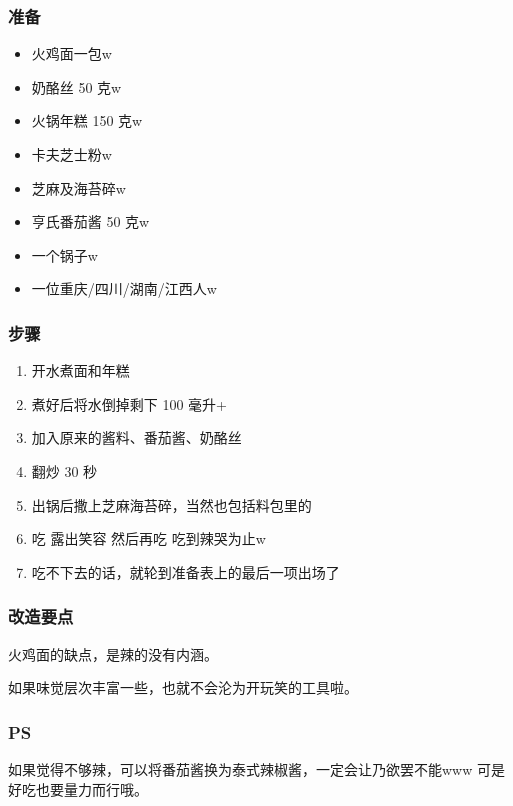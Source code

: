 \documentclass[12pt, a4paper]{ctexart}
\begin{document}
\subsubsection{准备}
\begin{itemize}
    \item{火鸡面一包w}
    \item{奶酪丝 50 克w}
    \item{火锅年糕 150 克w}
    \item{卡夫芝士粉w}
    \item{芝麻及海苔碎w}
    \item{亨氏番茄酱 50 克w}
    \item{一个锅子w}
    \item{一位重庆/四川/湖南/江西人w}
\end{itemize}

\subsubsection{步骤}
\begin{enumerate}[start=0]
    \item{开水煮面和年糕}
    \item{煮好后将水倒掉剩下 100 毫升+}
    \item{加入原来的酱料、番茄酱、奶酪丝}
    \item{翻炒 30 秒}
    \item{出锅后撒上芝麻海苔碎，当然也包括料包里的}
    \item{吃 露出笑容 然后再吃 吃到辣哭为止w}
    \item{吃不下去的话，就轮到准备表上的最后一项出场了}
\end{enumerate}

\subsubsection{改造要点}
火鸡面的缺点，是辣的没有内涵。

如果味觉层次丰富一些，也就不会沦为开玩笑的工具啦。

\subsubsection{PS}
如果觉得不够辣，可以将番茄酱换为泰式辣椒酱，一定会让乃欲罢不能www 可是好吃也要量力而行哦。
\end{document}
